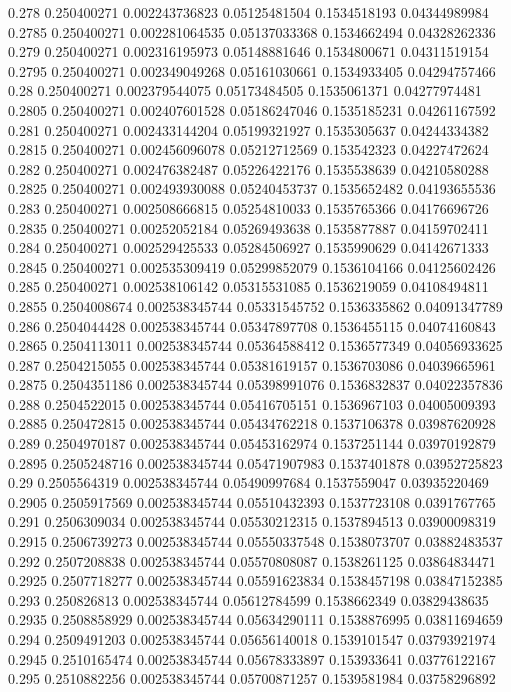 {0.278 0.250400271 0.002243736823 0.05125481504 0.1534518193 0.04344989984
0.2785 0.250400271 0.002281064535 0.05137033368 0.1534662494 0.04328262336
0.279 0.250400271 0.002316195973 0.05148881646 0.1534800671 0.04311519154
0.2795 0.250400271 0.002349049268 0.05161030661 0.1534933405 0.04294757466
0.28 0.250400271 0.002379544075 0.05173484505 0.1535061371 0.04277974481
0.2805 0.250400271 0.002407601528 0.05186247046 0.1535185231 0.04261167592
0.281 0.250400271 0.002433144204 0.05199321927 0.1535305637 0.04244334382
0.2815 0.250400271 0.002456096078 0.05212712569 0.153542323 0.04227472624
0.282 0.250400271 0.002476382487 0.05226422176 0.1535538639 0.04210580288
0.2825 0.250400271 0.002493930088 0.05240453737 0.1535652482 0.04193655536
0.283 0.250400271 0.002508666815 0.05254810033 0.1535765366 0.04176696726
0.2835 0.250400271 0.00252052184 0.05269493638 0.1535877887 0.04159702411
0.284 0.250400271 0.002529425533 0.05284506927 0.1535990629 0.04142671333
0.2845 0.250400271 0.002535309419 0.05299852079 0.1536104166 0.04125602426
0.285 0.250400271 0.002538106142 0.05315531085 0.1536219059 0.04108494811
0.2855 0.2504008674 0.002538345744 0.05331545752 0.1536335862 0.04091347789
0.286 0.2504044428 0.002538345744 0.05347897708 0.1536455115 0.04074160843
0.2865 0.2504113011 0.002538345744 0.05364588412 0.1536577349 0.04056933625
0.287 0.2504215055 0.002538345744 0.05381619157 0.1536703086 0.04039665961
0.2875 0.2504351186 0.002538345744 0.05398991076 0.1536832837 0.04022357836
0.288 0.2504522015 0.002538345744 0.05416705151 0.1536967103 0.04005009393
0.2885 0.250472815 0.002538345744 0.05434762218 0.1537106378 0.03987620928
0.289 0.2504970187 0.002538345744 0.05453162974 0.1537251144 0.03970192879
0.2895 0.2505248716 0.002538345744 0.05471907983 0.1537401878 0.03952725823
0.29 0.2505564319 0.002538345744 0.05490997684 0.1537559047 0.03935220469
0.2905 0.2505917569 0.002538345744 0.05510432393 0.1537723108 0.0391767765
0.291 0.2506309034 0.002538345744 0.05530212315 0.1537894513 0.03900098319
0.2915 0.2506739273 0.002538345744 0.05550337548 0.1538073707 0.03882483537
0.292 0.2507208838 0.002538345744 0.05570808087 0.1538261125 0.03864834471
0.2925 0.2507718277 0.002538345744 0.05591623834 0.1538457198 0.03847152385
0.293 0.250826813 0.002538345744 0.05612784599 0.1538662349 0.03829438635
0.2935 0.2508858929 0.002538345744 0.05634290111 0.1538876995 0.03811694659
0.294 0.2509491203 0.002538345744 0.05656140018 0.1539101547 0.03793921974
0.2945 0.2510165474 0.002538345744 0.05678333897 0.153933641 0.03776122167
0.295 0.2510882256 0.002538345744 0.05700871257 0.1539581984 0.03758296892
}
